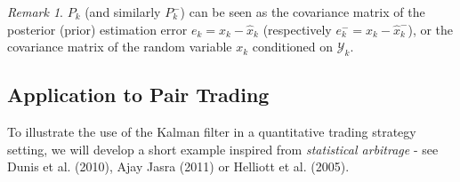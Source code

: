 \documentclass{article}
\theoremstyle{definition}
\theoremstyle{remark}
\newtheorem{remark}[thm]{Remark}
\newcommand{\filtrationObs}[1]{\ensuremath{\mathscr{Y}_{#1}}}
\begin{document}
\begin{remark}
$P_k$ (and similarly $P_k^-$) can be seen as the covariance matrix of the posterior (prior) estimation error $e_k=x_k-\hat{x}_k$ (respectively $e_k^-=x_k-\hat{x}_k^-$), or the covariance matrix of the random variable $x_k$ conditioned on \filtrationObs{k}.
\end{remark}













\subsection{Application to Pair Trading}
To illustrate the use of the Kalman filter in a quantitative trading strategy setting, we will develop a short example inspired from \emph{statistical arbitrage} - see Dunis et al. (2010), Ajay Jasra (2011) or Helliott et al. (2005). \\
\end{document}
